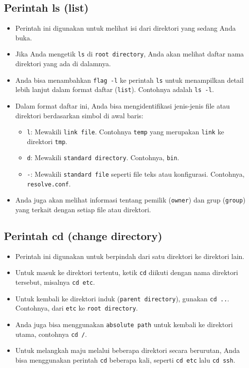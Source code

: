 \documentclass{article}
\begin{document}
\subsection{Perintah ls (list)}
\begin{itemize}
    \item Perintah ini digunakan untuk melihat isi dari direktori yang sedang Anda buka.
    \item Jika Anda mengetik \texttt{ls} di \texttt{root directory}, Anda akan melihat daftar nama direktori yang ada di dalamnya.
    \item Anda bisa menambahkan \texttt{flag -l} ke perintah \texttt{ls} untuk menampilkan detail lebih lanjut dalam format daftar (\texttt{list}). Contohnya adalah \texttt{ls -l}.
    \item Dalam format daftar ini, Anda bisa mengidentifikasi jenis-jenis file atau direktori berdasarkan simbol di awal baris:
          \begin{itemize}
              \item \texttt{l}: Mewakili \texttt{link file}. Contohnya \texttt{temp} yang merupakan \texttt{link} ke direktori \texttt{tmp}.
              \item \texttt{d}: Mewakili \texttt{standard directory}. Contohnya, \texttt{bin}.
              \item \texttt{-}: Mewakili \texttt{standard file} seperti file teks atau konfigurasi. Contohnya, \texttt{resolve.conf}.
          \end{itemize}
    \item Anda juga akan melihat informasi tentang pemilik (\texttt{owner}) dan grup (\texttt{group}) yang terkait dengan setiap file atau direktori.
\end{itemize}

\subsection{Perintah cd (change directory)}
\begin{itemize}
    \item Perintah ini digunakan untuk berpindah dari satu direktori ke direktori lain.
    \item Untuk masuk ke direktori tertentu, ketik \texttt{cd} diikuti dengan nama direktori tersebut, misalnya \texttt{cd etc}.
    \item Untuk kembali ke direktori induk (\texttt{parent directory}), gunakan \texttt{cd ..}. Contohnya, dari \texttt{etc} ke \texttt{root directory}.
    \item Anda juga bisa menggunakan \texttt{absolute path} untuk kembali ke direktori utama, contohnya \texttt{cd /}.
    \item Untuk melangkah maju melalui beberapa direktori secara berurutan, Anda bisa menggunakan perintah \texttt{cd} beberapa kali, seperti \texttt{cd etc} lalu \texttt{cd ssh}.
\end{itemize}
\end{document}
